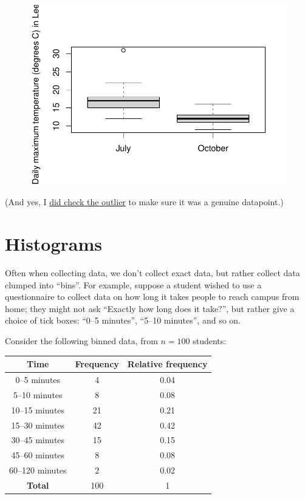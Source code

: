 \documentclass[
  letterpaper,
]{report}
\theoremstyle{definition}
\theoremstyle{definition}
\theoremstyle{remark}
\begin{document}
\begin{figure}[H]

{\centering \includegraphics{sections/L02-dataviz_files/figure-pdf/boxplot-temp-1.pdf}

}

\end{figure}

(And yes, I
\href{https://www.metoffice.gov.uk/binaries/content/assets/metofficegovuk/pdf/weather/learn-about/uk-past-events/interesting/2020/2020_05_july_temperature.pdf}{did
check the outlier} to make sure it was a genuine datapoint.)

\hypertarget{histograms}{%
\section{Histograms}\label{histograms}}

Often when collecting data, we don't collect exact data, but rather
collect data clumped into ``bins''. For example, suppose a student
wished to use a questionnaire to collect data on how long it takes
people to reach campus from home; they might not ask ``Exactly how long
does it take?'', but rather give a choice of tick boxes: ``0--5
minutes'', ``5--10 minutes'', and so on.

Consider the following binned data, from \(n = 100\) students:

\begin{longtable}[]{@{}ccc@{}}
\toprule()
Time & Frequency & Relative frequency \\
\midrule()
\endhead
0--5 minutes & 4 & 0.04 \\
5--10 minutes & 8 & 0.08 \\
10--15 minutes & 21 & 0.21 \\
15--30 minutes & 42 & 0.42 \\
30--45 minutes & 15 & 0.15 \\
45--60 minutes & 8 & 0.08 \\
60--120 minutes & 2 & 0.02 \\
\textbf{Total} & 100 & 1 \\
\bottomrule()
\end{longtable}
\end{document}
